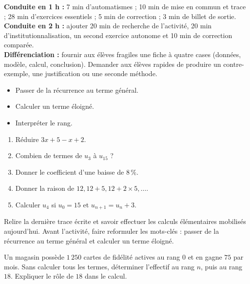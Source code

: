     \ifprof
    \begin{methode}
    \textbf{Conduite en 1 h :} 7 min d'automatismes ; 10 min de mise en commun et trace ; 28 min d'exercices essentiels ; 5 min de correction ; 3 min de billet de sortie.\\
    \textbf{Conduite en 2 h :} ajouter 20 min de recherche de l'activité, 20 min d'institutionnalisation, un second exercice autonome et 10 min de correction comparée.\\
    \textbf{Différenciation :} fournir aux élèves fragiles une fiche à quatre cases (données, modèle, calcul, conclusion). Demander aux élèves rapides de produire un contre-exemple, une justification ou une seconde méthode.
    \end{methode}
    \fi
{}
\begin{objectifs}\begin{itemize}\item Passer de la récurrence au terme général.\item Calculer un terme éloigné.\item Interpréter le rang.\end{itemize}\end{objectifs}
\begin{automatismes}\begin{enumerate}\item Réduire $3x+5-x+2$. \item Combien de termes de $u_3$ à $u_{15}$ ? \item Donner le coefficient d'une baisse de $8\,\%$. \item Donner la raison de $12,12+5,12+2\times5,\ldots$. \item Calculer $u_4$ si $u_0=15$ et $u_{n+1}=u_n+3$. \end{enumerate}\end{automatismes}
\begin{prerequis}Relire la dernière trace écrite et savoir effectuer les calculs élémentaires mobilisés aujourd'hui. Avant l'activité, faire reformuler les mots-clés : passer de la récurrence au terme général et calculer un terme éloigné.\end{prerequis}

\begin{activite}
Un magasin possède $1\,250$ cartes de fidélité actives au rang $0$ et en gagne $75$ par mois. Sans calculer tous les termes, déterminer l'effectif au rang $n$, puis au rang $18$. Expliquer le rôle de $18$ dans le calcul.

\end{activite}

